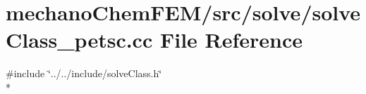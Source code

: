 \section{mechano\-Chem\-F\-E\-M/src/solve/solve\-Class\-\_\-petsc.cc File Reference}
\label{solve_class__petsc_8cc}
{\ttfamily \#include \char`\"{}../../include/solve\-Class.\-h\char`\"{}}\\*
